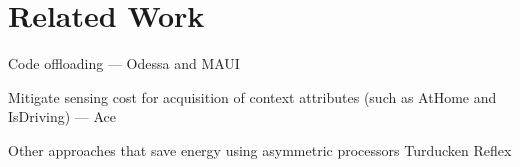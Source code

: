 \section{Related Work}\label{sec:related}

Code offloading --- Odessa and MAUI

Mitigate sensing cost for acquisition of context attributes (such as AtHome and
IsDriving) --- Ace

Other approaches that save energy using asymmetric processors
Turducken
Reflex
